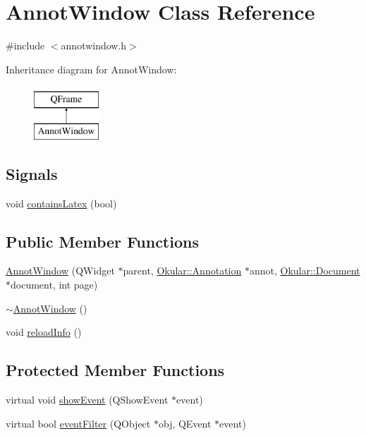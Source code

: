 \hypertarget{classAnnotWindow}{\section{Annot\+Window Class Reference}
\label{classAnnotWindow}
}


{\ttfamily \#include $<$annotwindow.\+h$>$}

Inheritance diagram for Annot\+Window\+:\begin{figure}[H]
\begin{center}
\leavevmode
\includegraphics[height=2.000000cm]{classAnnotWindow}
\end{center}
\end{figure}
\subsection*{Signals}
\begin{DoxyCompactItemize}
\item 
void \hyperlink{classAnnotWindow_a920b2483b708366d4f672a8994c6af6c}{contains\+Latex} (bool)
\end{DoxyCompactItemize}
\subsection*{Public Member Functions}
\begin{DoxyCompactItemize}
\item 
\hyperlink{classAnnotWindow_a125253e7bdaba20eeecadbd6cc37c207}{Annot\+Window} (Q\+Widget $\ast$parent, \hyperlink{classOkular_1_1Annotation}{Okular\+::\+Annotation} $\ast$annot, \hyperlink{classOkular_1_1Document}{Okular\+::\+Document} $\ast$document, int page)
\item 
\hyperlink{classAnnotWindow_a344457acef95f42f54e4f97502c4deec}{$\sim$\+Annot\+Window} ()
\item 
void \hyperlink{classAnnotWindow_ae573e563b95f71d5321227c146b91a1e}{reload\+Info} ()
\end{DoxyCompactItemize}
\subsection*{Protected Member Functions}
\begin{DoxyCompactItemize}
\item 
virtual void \hyperlink{classAnnotWindow_a029c591d201eae567dedda50bdffc3fe}{show\+Event} (Q\+Show\+Event $\ast$event)
\item 
virtual bool \hyperlink{classAnnotWindow_aed45dcb7095782f5d5cabacb1a856379}{event\+Filter} (Q\+Object $\ast$obj, Q\+Event $\ast$event)
\end{DoxyCompactItemize}


